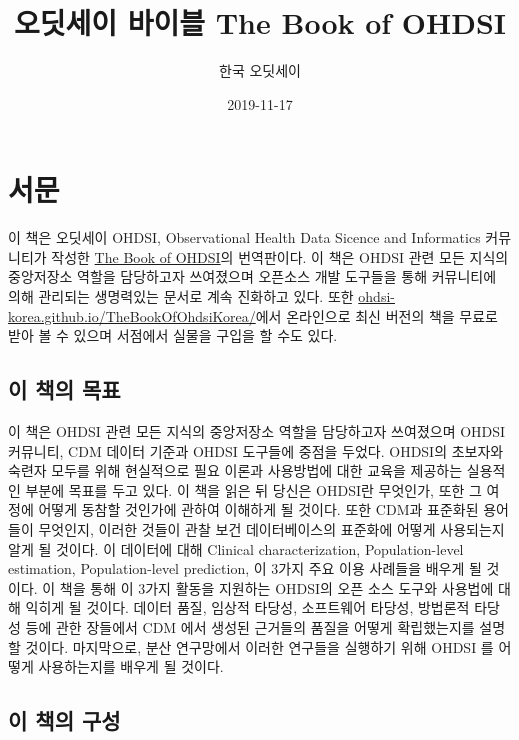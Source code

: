 \documentclass[11pt]{book}
\title{오딧세이 바이블 The Book of OHDSI}
\author{한국 오딧세이}
\date{2019-11-17}
\theoremstyle{definition}
\theoremstyle{definition}
\theoremstyle{definition}
\theoremstyle{remark}
\begin{document}
\maketitle

{
\setcounter{tocdepth}{1}
\tableofcontents
}
\chapter*{서문}

 이 책은 오딧세이 OHDSI, Observational Health Data Sicence and
Informatics 커뮤니티가 작성한 \href{book.ohdsi.org}{The Book of OHDSI}의
번역판이다. 이 책은 OHDSI 관련 모든 지식의 중앙저장소 역할을 담당하고자
쓰여졌으며 오픈소스 개발 도구들을 통해 커뮤니티에 의해 관리되는
생명력있는 문서로 계속 진화하고 있다. 또한
\href{https://ohdsi-korea.github.io/TheBookOfOhdsiKorea/}{ohdsi-korea.github.io/TheBookOfOhdsiKorea/}에서
온라인으로 최신 버전의 책을 무료로 받아 볼 수 있으며 서점에서 실물을
구입을 할 수도 있다.

\section*{이 책의 목표}\label{--}

이 책은 OHDSI 관련 모든 지식의 중앙저장소 역할을 담당하고자 쓰여졌으며
OHDSI 커뮤니티, CDM 데이터 기준과 OHDSI 도구들에 중점을 두었다. OHDSI의
초보자와 숙련자 모두를 위해 현실적으로 필요 이론과 사용방법에 대한
교육을 제공하는 실용적인 부분에 목표를 두고 있다. 이 책을 읽은 뒤 당신은
OHDSI란 무엇인가, 또한 그 여정에 어떻게 동참할 것인가에 관하여 이해하게
될 것이다. 또한 CDM과 표준화된 용어들이 무엇인지, 이러한 것들이 관찰
보건 데이터베이스의 표준화에 어떻게 사용되는지 알게 될 것이다. 이
데이터에 대해 Clinical characterization, Population-level estimation,
Population-level prediction, 이 3가지 주요 이용 사례들을 배우게 될
것이다. 이 책을 통해 이 3가지 활동을 지원하는 OHDSI의 오픈 소스 도구와
사용법에 대해 익히게 될 것이다. 데이터 품질, 임상적 타당성, 소프트웨어
타당성, 방법론적 타당성 등에 관한 장들에서 CDM 에서 생성된 근거들의
품질을 어떻게 확립했는지를 설명할 것이다. 마지막으로, 분산 연구망에서
이러한 연구들을 실행하기 위해 OHDSI 를 어떻게 사용하는지를 배우게 될
것이다.

\section*{이 책의 구성}\label{--}
\end{document}
